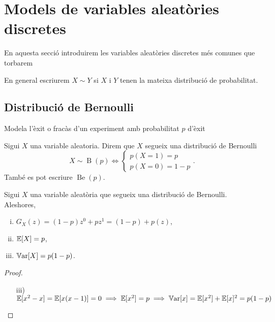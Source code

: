 \section{Models de variables aleatòries discretes}

En aquesta secció introduirem les variables aleatòries discretes més comunes que torbarem

\begin{obs}
    En general escriurem $X \sim Y$ si $X$ i $Y$ tenen la mateixa distribució de probabilitat.
\end{obs}

\subsection*{Distribució de Bernoulli}

Modela l'èxit o fracàs d'un experiment amb probabilitat $p$ d'èxit

\begin{defi}
    Sigui $X$ una variable aleatoria. Direm que $X$ segueix una distribució de Bernoulli 
    \[X \sim \operatorname{B}(p) \iff \begin{cases}
                       p(X=1) = p \\
                       p(X=0) = 1-p
                       \end{cases}.
    \]
    També es pot escriure $\operatorname{Be}(p)$.
\end{defi}

\begin{prop}
    Sigui $X$ una variable aleatòria que segueix una distribució de Bernoulli. Aleshores,
    \begin{enumerate}[i)]
        \item $G_X(z) = (1-p)z^0 + pz^1 = (1-p) + p(z)$,
        \item $\operatorname{\mathbb{E}}[X] = p$,
        \item $\operatorname{\mathbb{V}ar}[X] = p(1-p)$.
    \end{enumerate}
\end{prop}

\begin{proof} %
    \begin{enumerate}[i)]
        \item[]
        \item[iii)] $\operatorname{\mathbb{E}}[x^2-x]= \operatorname{\mathbb{E}}[x(x-1)] = 0 \implies \operatorname{\mathbb{E}}[x^2] = p \implies \operatorname{\mathbb{V}ar}[x] = \operatorname{\mathbb{E}}[x^2] + \operatorname{\mathbb{E}}[x]^2
        = p(1-p)$
    \end{enumerate}
\end{proof}


